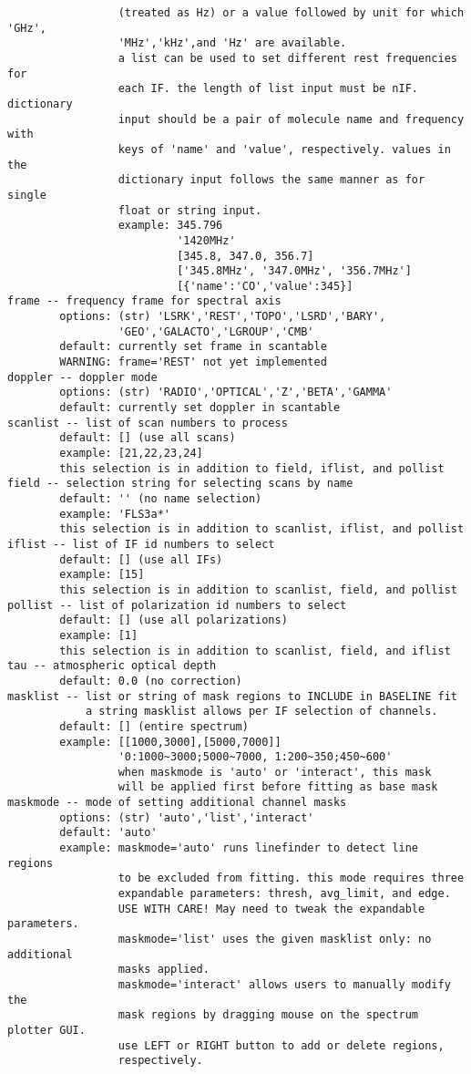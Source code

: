 \begin{verbatim}
                 (treated as Hz) or a value followed by unit for which 'GHz',
                 'MHz','kHz',and 'Hz' are available. 
                 a list can be used to set different rest frequencies for 
                 each IF. the length of list input must be nIF. dictionary 
                 input should be a pair of molecule name and frequency with 
                 keys of 'name' and 'value', respectively. values in the 
                 dictionary input follows the same manner as for single 
                 float or string input. 
                 example: 345.796
                          '1420MHz'
                          [345.8, 347.0, 356.7]
                          ['345.8MHz', '347.0MHz', '356.7MHz']
                          [{'name':'CO','value':345}]
frame -- frequency frame for spectral axis
        options: (str) 'LSRK','REST','TOPO','LSRD','BARY',
                 'GEO','GALACTO','LGROUP','CMB'
        default: currently set frame in scantable
        WARNING: frame='REST' not yet implemented
doppler -- doppler mode
        options: (str) 'RADIO','OPTICAL','Z','BETA','GAMMA'
        default: currently set doppler in scantable
scanlist -- list of scan numbers to process
        default: [] (use all scans)
        example: [21,22,23,24]
        this selection is in addition to field, iflist, and pollist
field -- selection string for selecting scans by name
        default: '' (no name selection)
        example: 'FLS3a*'
        this selection is in addition to scanlist, iflist, and pollist
iflist -- list of IF id numbers to select
        default: [] (use all IFs)
        example: [15]
        this selection is in addition to scanlist, field, and pollist
pollist -- list of polarization id numbers to select
        default: [] (use all polarizations)
        example: [1]
        this selection is in addition to scanlist, field, and iflist
tau -- atmospheric optical depth
        default: 0.0 (no correction)
masklist -- list or string of mask regions to INCLUDE in BASELINE fit
            a string masklist allows per IF selection of channels.
        default: [] (entire spectrum)
        example: [[1000,3000],[5000,7000]]
                 '0:1000~3000;5000~7000, 1:200~350;450~600'
                 when maskmode is 'auto' or 'interact', this mask 
                 will be applied first before fitting as base mask
maskmode -- mode of setting additional channel masks
        options: (str) 'auto','list','interact'
        default: 'auto'
        example: maskmode='auto' runs linefinder to detect line regions 
                 to be excluded from fitting. this mode requires three 
                 expandable parameters: thresh, avg_limit, and edge.
                 USE WITH CARE! May need to tweak the expandable parameters.
                 maskmode='list' uses the given masklist only: no additional 
                 masks applied.
                 maskmode='interact' allows users to manually modify the 
                 mask regions by dragging mouse on the spectrum plotter GUI.
                 use LEFT or RIGHT button to add or delete regions, 
                 respectively.
       

\end{verbatim}
